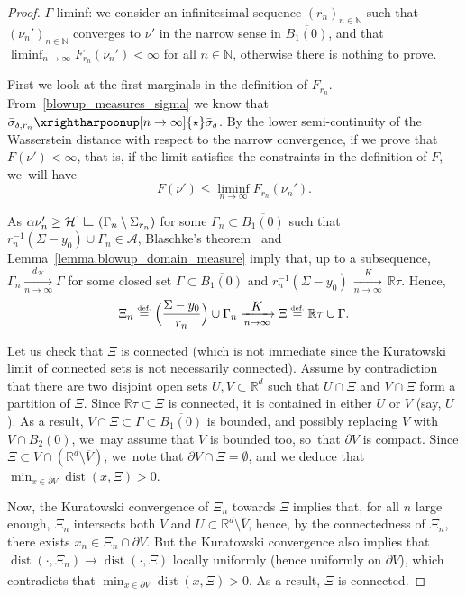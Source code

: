 \documentclass[JEP,XML,SOM,Unicode,NoFloatCountersInSection,published]{cedram}
\let\ts\textstyle
\theoremstyle{definition}
\newcommand{\eqdef}{\ensuremath{\stackrel{\mbox{\upshape\tiny def.}}{=}}}
\newcommand\LM[1]{\hbox{\vrule width.5pt \vbox to#1pt{\vfill \hrule width#1pt height.5pt}}}
\newcommand\LL{{\mathchoice {\>\LM7\>}{\>\LM7\>}{\,\LM5\,}{\,\LM{3.35}\,}}}
\newcommand{\mres}{\LL}
\newcommand\cH{\mathcal{H}}
\newcommand{\RR}{\mathbb{R}}
\DeclareMathOperator{\dist}{dist}
\newcommand{\distH}{d_{\mathcal{H}}}
\begin{document}
\begin{proof}

$\Gamma$-liminf: we consider an infinitesimal sequence $(r_n)_{n \in \mathbb{N}}$ such that ${(\nu_{n}')}_{n \in \mathbb{N}}$ converges to $\nu'$ in the narrow
sense in $\overline{B_1(0)}$, and that $\liminf_{n \to \infty} F_{r_n}(\nu_n') < \infty$ for all $n \in \mathbb{N}$, otherwise there is nothing to prove.

First we look at the first marginals in the definition of $F_{r_n}$. From~\eqref{blowup_measures_sigma} we know that $\bar \sigma_{\delta, r_n}\xrightharpoonup[n \to \infty]{\star} \bar\sigma_{\delta}$.
By the lower semi-continuity of the Wasserstein distance with respect to the narrow convergence,
if we prove that $F(\nu') < \infty$, that is, if the limit satisfies the constraints in the definition of $F$, we~will have
\[
F(\nu') \le \liminf_{n \to \infty} F_{r_n}(\nu_n').
\]

As $\alpha \nu_n' \ge \cH^1\mres \left(\Gamma_{n}\setminus\Sigma_{r_n}\right)$ for some $\Gamma_n \subset \overline{B_1(0)}$ such that $r_n^{-1}(\Sigma-y_0)\cup \Gamma_n \in \mathcal{A}$, Blaschke's theorem~\cite[Th.\,6.1]{ambrosio2000functions}
and Lemma~\ref{lemma.blowup_domain_measure} imply that, up to a subsequence, $\Gamma_n \xrightarrow[n \to \infty]{\distH} \Gamma$ for some closed set $\Gamma \subset \overline{ B_1(0)}$ and $r_n^{-1}(\Sigma-y_0)\,{\xrightarrow[n \to \infty]{K}}\, \RR\tau$. Hence,
\[
\Xi_n
\eqdef
\Bigl(
\frac{\Sigma - y_0}{r_n}
\Bigr)
\cup \Gamma_n
\xrightarrow[n \to \infty]{\ts K}
\Xi
\eqdef
\RR\tau \cup \Gamma.
\]

Let us check that $\Xi$ is connected (which is not immediate since the Kuratowski limit of connected sets is not necessarily connected).
Assume by contradiction that there are two disjoint open sets $U,V \subset \RR^d$ such that $U\cap \Xi$ and $V\cap \Xi$ form a partition of $\Xi$. Since $\RR\tau \subset \Xi$ is connected, it is contained in either $U$ or $V$ (say, $U$). As a result, $V\cap \Xi\subset \Gamma \subset \overline{B_1(0)}$ is bounded, and possibly replacing $V$ with $V\cap B_2(0)$, we~may assume that $V$ is bounded too, so~that $\partial V$ is compact.
Since $\Xi\subset V\cap (\RR^d\setminus \overline{V})$, we~note that $\partial V \cap \Xi=\emptyset$, and we deduce that $\min_{x\in \partial V} \dist(x,\Xi)>0$.

Now, the Kuratowski convergence of $\Xi_n$ towards $\Xi$ implies that, for all $n$ large enough, $\Xi_n$ intersects both $V$ and $U\subset \RR^d\setminus \overline{V}$, hence, by the connectedness of $\Xi_n$, there exists $x_n\in \Xi_n \cap \partial V$.
But the Kuratowski convergence also implies that $\dist(\cdot,\Xi_n) \xrightarrow[]{} \dist(\cdot,\Xi)$ locally uniformly (hence uniformly on $\partial V$), which contradicts that $\min_{x\in \partial V} \dist(x,\Xi)>0$. As a result, $\Xi$ is connected.


\end{proof}
\end{document}
